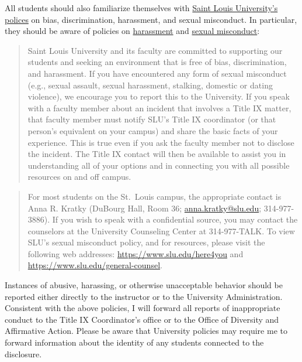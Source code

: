 \documentclass[]{book}
\begin{document}
All students should also familiarize themselves with \href{http://www.slu.edu/general-counsel/institutional-equity-diversity/}{Saint Louis University's polices} on bias, discrimination, harassment, and sexual misconduct. In particular, they should be aware of policies on \href{http://www.slu.edu/general-counsel/institutional-equity-diversity/harassment.php}{harassment} and \href{https://www.slu.edu/about/safety/sexual-assault-resources.php}{sexual misconduct}:

\begin{quote}
Saint Louis University and its faculty are committed to supporting our students and seeking an environment that is free of bias, discrimination, and harassment. If you have encountered any form of sexual misconduct (e.g., sexual assault, sexual harassment, stalking, domestic or dating violence), we encourage you to report this to the University. If you speak with a faculty member about an incident that involves a Title IX matter, that faculty member must notify SLU's Title IX coordinator (or that person's equivalent on your campus) and share the basic facts of your experience. This is true even if you ask the faculty member not to disclose the incident. The Title IX contact will then be available to assist you in understanding all of your options and in connecting you with all possible resources on and off campus.
\end{quote}

\begin{quote}
For most students on the St.~Louis campus, the appropriate contact is Anna R. Kratky (DuBourg Hall, Room 36; \url{anna.kratky@slu.edu}; 314-977-3886). If you wish to speak with a confidential source, you may contact the counselors at the University Counseling Center at 314-977-TALK. To view SLU's sexual misconduct policy, and for resources, please visit the following web addresses: \url{https://www.slu.edu/here4you} and \url{https://www.slu.edu/general-counsel}.
\end{quote}

Instances of abusive, harassing, or otherwise unacceptable behavior should be reported either directly to the instructor or to the University Administration. Consistent with the above policies, I will forward all reports of inappropriate conduct to the Title IX Coordinator's office or to the Office of Diversity and Affirmative Action. Please be aware that University policies may require me to forward information about the identity of any students connected to the disclosure.
\end{document}
